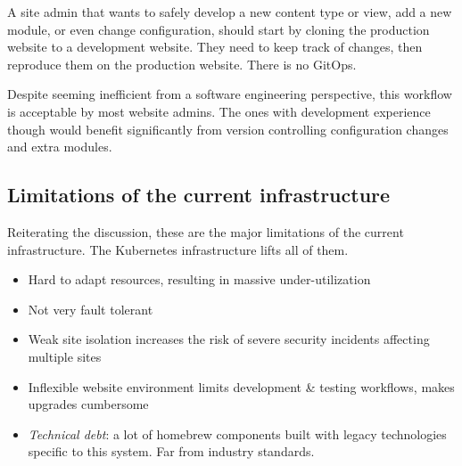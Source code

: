 A site admin that wants to safely develop a new content type or view, add a new module, or even change configuration, should start by cloning the production website to a development website.
They need to keep track of changes, then reproduce them on the production website.
There is no GitOps.

Despite seeming inefficient from a software engineering perspective, this workflow is acceptable by most website admins.
The ones with development experience though would benefit significantly from version controlling configuration changes and extra modules.

\subsection{Limitations of the current infrastructure}

Reiterating the discussion, these are the major limitations of the current infrastructure.
The Kubernetes infrastructure lifts all of them.

\begin{itemize}
    \item Hard to adapt resources, resulting in massive under-utilization
    \item Not very fault tolerant
    \item Weak site isolation increases the risk of severe security incidents affecting multiple sites
    \item Inflexible website environment limits development \& testing workflows, makes upgrades cumbersome 
    \item \emph{Technical debt}: a lot of homebrew components built with legacy technologies specific to this system.
          Far from industry standards.
\end{itemize}
